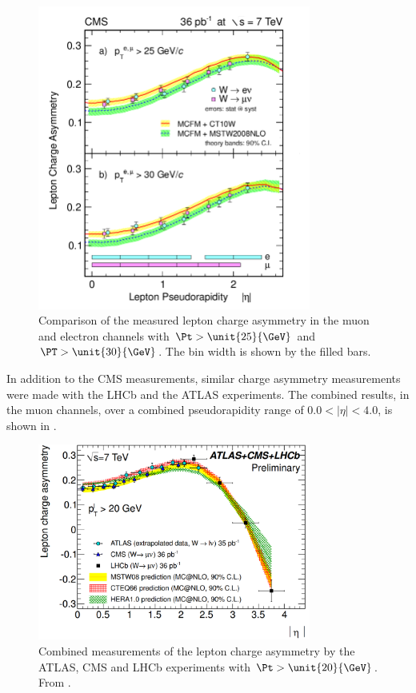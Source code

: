 \begin{figure}[htbp]
  \begin{center}
  \includegraphics*[width=0.8\textwidth]{combined}
  \caption[Comparison of the measured lepton charge asymmetry in the muon and
electron channels] { Comparison of the measured lepton charge asymmetry in the
muon and electron channels with $\Pt>\unit{25}{\GeV}$ and $\PT>\unit{30}{\GeV}$.
The bin width is shown by the filled bars\cite{asym36}.}
  \label{fig:combined}
  \end{center}
\end{figure}

In addition to the CMS measurements, similar charge asymmetry measurements were
made with the LHCb and the ATLAS experiments. The combined results, in the muon
channels, over a combined pseudorapidity range of $0.0 < |\eta | < 4.0$, is
shown in .
\begin{figure}[htbp]
  \begin{center}
  \includegraphics*[width=0.8\textwidth]{atlas_cms_lhcb}
  \caption[Combined measurements of the lepton charge asymmetry by the ATLAS,
CMS and LHCb experiments with $\Pt>\unit{20}{\GeV}$.] {Combined measurements of
the lepton charge asymmetry by the ATLAS, CMS and LHCb experiments with
$\Pt>\unit{20}{\GeV}$. From \cite{ATLAS-CONF-2011-129}.}
  \label{fig:ex_combined}
  \end{center}
\end{figure}

